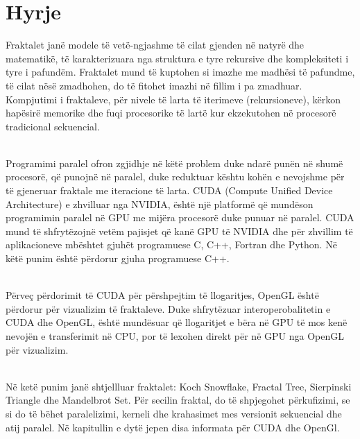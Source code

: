 \chapter{Hyrje}

Fraktalet janë modele të vetë-ngjashme të cilat gjenden në natyrë dhe matematikë, të karakterizuara nga struktura e tyre rekursive dhe kompleksiteti i tyre i pafundëm. Fraktalet mund të kuptohen si imazhe me madhësi të pafundme, të cilat nësë zmadhohen, do të fitohet imazhi në fillim i pa zmadhuar. Kompjutimi i fraktaleve, për nivele të larta të iterimeve (rekursioneve), kërkon hapësirë memorike dhe fuqi procesorike të lartë kur ekzekutohen në procesorë tradicional sekuencial. 

\noindent \\ Programimi paralel ofron zgjidhje në këtë problem duke ndarë punën në shumë procesorë, që punojnë në paralel, duke reduktuar kështu kohën e nevojshme për të gjeneruar fraktale me iteracione të larta. CUDA (Compute Unified Device Architecture) e zhvilluar nga NVIDIA, është një platformë që mundëson programimin paralel në GPU me mijëra procesorë duke punuar në paralel. CUDA mund të shfrytëzojnë vetëm pajisjet që kanë GPU të NVIDIA dhe për zhvillim të aplikacioneve mbështet gjuhët programuese C, C++, Fortran dhe Python. Në këtë punim është përdorur gjuha programuese C++.

\noindent \\ Përveç përdorimit të CUDA për përshpejtim të llogaritjes, OpenGL është përdorur për vizualizim të fraktaleve. Duke shfrytëzuar interoperobalitetin e CUDA dhe OpenGL, është mundësuar që llogaritjet e bëra në GPU të mos kenë nevojën e transferimit në CPU, por të lexohen direkt për në GPU nga OpenGL për vizualizim.  

\noindent \\ Në ketë punim janë shtjellluar fraktalet: Koch Snowflake, Fractal Tree, Sierpinski Triangle dhe Mandelbrot Set. Për secilin fraktal, do të shpjegohet përkufizimi, se si do të bëhet paralelizimi, kerneli dhe krahasimet mes versionit sekuencial dhe atij paralel. Në kapitullin e dytë jepen disa informata për CUDA dhe OpenGl. 